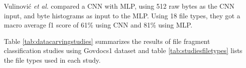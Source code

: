Vulinović \textit{et al.} \cite{vulinovic_neural_2019}
compared a CNN with MLP, using 512 raw bytes as the CNN input, and byte histograms as input to the MLP.
Using 18 file types, they got a macro average f1 score of 61\% using CNN and 81\% using MLP.

Table \ref{tab:datacarvingstudies} summarizes 
the results of file fragment classification studies using Govdocs1 dataset and table \ref{tab:studiesfiletypes}
lists the file types used in each study.










